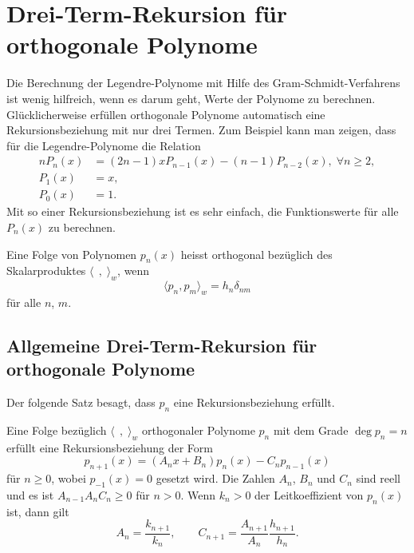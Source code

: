 %
%
%
\section{Drei-Term-Rekursion für orthogonale Polynome
\label{buch:orthogonal:section:drei-term-rekursion}}
Die Berechnung der Legendre-Polynome mit Hilfe des Gram-Schmidt-Verfahrens
ist wenig hilfreich, wenn es darum geht, Werte der Polynome zu berechnen.
Glücklicherweise erfüllen orthogonale Polynome automatisch eine 
Rekursionsbeziehung mit nur drei Termen.
Zum Beispiel kann man zeigen, dass für die Legendre-Polynome die
Relation
\begin{align*}
nP_n(x) &= (2n-1)xP_{n-1}(x) - (n-1)P_{n-2}(x),\;\forall n\ge 2,
\\
P_1(x) &= x,
\\
P_0(x) &= 1.
\end{align*}
Mit so einer Rekursionsbeziehung ist es sehr einfach, die Funktionswerte
für alle $P_n(x)$ zu berechnen.

\begin{definition}
Eine Folge von Polynomen $p_n(x)$ heisst orthogonal bezüglich des
Skalarproduktes $\langle\,\;,\;\rangle_w$, wenn 
\[
\langle p_n,p_m\rangle_w = h_n \delta_{nm}
\]
für alle $n$, $m$.
\end{definition}

\subsection{Allgemeine Drei-Term-Rekursion für orthogonale Polynome}
Der folgende Satz besagt, dass $p_n$ eine Rekursionsbeziehung erfüllt.

\begin{satz}
\label{buch:orthogonal:satz:drei-term-rekursion}
Eine Folge bezüglich $\langle\,\;,\;\rangle_w$ orthogonaler Polynome $p_n$ 
mit dem Grade $\deg p_n = n$ erfüllt eine Rekursionsbeziehung der Form
\begin{equation}
p_{n+1}(x)
=
(A_nx+B_n)p_n(x) - C_np_{n-1}(x)
\label{buch:orthogonal:eqn:rekursion}
\end{equation}
für $n\ge 0$, wobei $p_{-1}(x)=0$ gesetzt wird.
Die Zahlen $A_n$, $B_n$ und $C_n$ sind reell und es ist
$A_{n-1}A_nC_n\ge 0$ für $n>0$. 
Wenn $k_n>0$ der Leitkoeffizient von $p_n(x)$ ist, dann gilt
\begin{equation}
A_n=\frac{k_{n+1}}{k_n},
\qquad
C_{n+1} = \frac{A_{n+1}}{A_n}\frac{h_{n+1}}{h_n}.
\label{buch:orthogonal:eqn:koeffizientenrelation}
\end{equation}
\end{satz}

